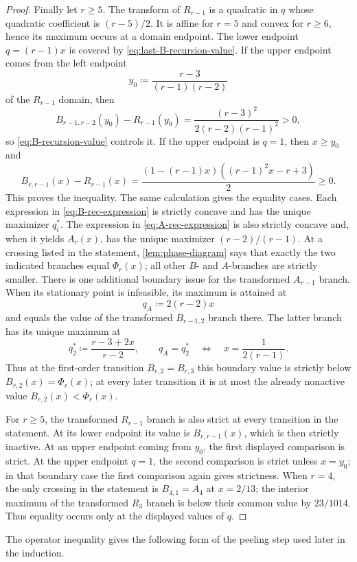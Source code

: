 \documentclass[10pt]{article}
\numberwithin{equation}{section}
\begin{document}
\begin{proof}
Finally let $r\ge5$.  The transform of $R_{r-1}$ is a quadratic in $q$ whose quadratic coefficient is $(r-5)/2$.  It is affine for $r=5$ and convex for $r\ge6$, hence its maximum occurs at a domain endpoint.  The lower endpoint $q=(r-1)x$ is covered by \cref{eq:last-B-recursion-value}.  If the upper endpoint comes from the left endpoint
\[
 y_0\coloneqq\frac{r-3}{(r-1)(r-2)}
\]
of the $R_{r-1}$ domain, then
\[
 B_{r-1,r-2}(y_0)-R_{r-1}(y_0)
 =\frac{(r-3)^2}{2(r-2)(r-1)^2}>0,
\]
so \cref{eq:B-recursion-value} controls it.  If the upper endpoint is $q=1$, then $x\ge y_0$ and
\[
 B_{r,r-1}(x)-R_{r-1}(x)
 =\frac{(1-(r-1)x)((r-1)^2x-r+3)}2\ge0.
\]
This proves the inequality.  The same calculation gives the equality cases.  Each expression in \cref{eq:B-rec-expression} is strictly concave and has the unique maximizer $q_i^*$.  The expression in \cref{eq:A-rec-expression} is also strictly concave and, when it yields $A_r(x)$, has the unique maximizer $(r-2)/(r-1)$.  At a crossing listed in the statement, \cref{lem:phase-diagram} says that exactly the two indicated branches equal $\Phi_r(x)$; all other $B$- and $A$-branches are strictly smaller.  There is one additional boundary issue for the transformed $A_{r-1}$ branch.  When its stationary point is infeasible, its maximum is attained at
\[
 q_A\coloneqq2(r-2)x
\]
and equals the value of the transformed $B_{r-1,2}$ branch there.  The latter branch has its unique maximum at
\[
 q_2^*\coloneqq\frac{r-3+2x}{r-2},
 \qquad
 q_A=q_2^*\quad\Longleftrightarrow\quad
 x=\frac1{2(r-1)}.
\]
Thus at the first-order transition $B_{r,2}=B_{r,3}$ this boundary value is strictly below $B_{r,2}(x)=\Phi_r(x)$; at every later transition it is at most the already nonactive value $B_{r,2}(x)<\Phi_r(x)$.

For $r\ge5$, the transformed $R_{r-1}$ branch is also strict at every transition in the statement.  At its lower endpoint its value is $B_{r,r-1}(x)$, which is then strictly inactive.  At an upper endpoint coming from $y_0$, the first displayed comparison is strict.  At the upper endpoint $q=1$, the second comparison is strict unless $x=y_0$; in that boundary case the first comparison again gives strictness.  When $r=4$, the only crossing in the statement is $B_{4,1}=A_4$ at $x=2/13$; the interior maximum of the transformed $R_3$ branch is below their common value by $23/1014$.  Thus equality occurs only at the displayed values of $q$.
\end{proof}

The operator inequality gives the following form of the peeling step used later in the induction.
\end{document}
